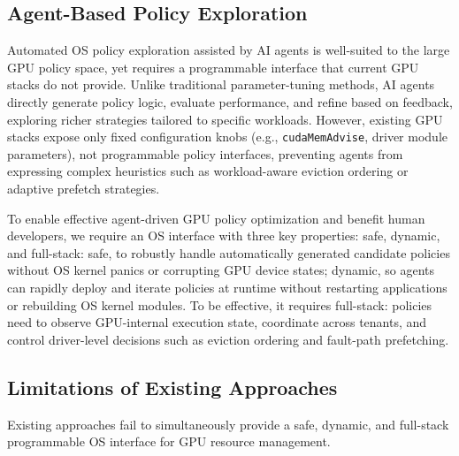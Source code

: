 \subsection{Agent-Based Policy Exploration}
\label{sec:motivation-agent}

Automated OS policy exploration assisted by AI agents is well-suited to the large GPU policy space, yet requires a programmable interface that current GPU stacks do not provide. Unlike traditional parameter-tuning methods, AI agents~\cite{dwivedula2025policysmith,zheng2025schedcp} directly generate policy logic, evaluate performance, and refine based on feedback, exploring richer strategies tailored to specific workloads. However, existing GPU stacks expose only fixed configuration knobs (e.g., \texttt{cudaMemAdvise}, driver module parameters), not programmable policy interfaces, preventing agents from expressing complex heuristics such as workload-aware eviction ordering or adaptive prefetch strategies.

To enable effective agent-driven GPU policy optimization and benefit human developers, we require an OS interface with three key properties: safe, dynamic, and full-stack: safe, to robustly handle automatically generated candidate policies without OS kernel panics or corrupting GPU device states; dynamic, so agents can rapidly deploy and iterate policies at runtime without restarting applications or rebuilding OS kernel modules. To be effective, it requires full-stack: policies need to observe GPU-internal execution state, coordinate across tenants, and control driver-level decisions such as eviction ordering and fault-path prefetching.

\subsection{Limitations of Existing Approaches}
\label{sec:motivation-limitations}

Existing approaches fail to simultaneously provide a safe, dynamic, and full-stack programmable OS interface for GPU resource management.

